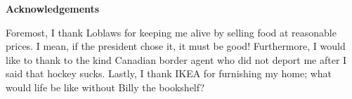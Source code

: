 \begin{center}\textbf{Acknowledgements}\end{center}


Foremost, I thank Loblaws for keeping me alive by selling food at reasonable prices.
I mean, if the president chose it, it must be good!
Furthermore, I would like to thank to the kind Canadian border agent who did not deport me after I said that hockey sucks.
Lastly, I thank IKEA for furnishing my home; what would life be like without Billy the bookshelf?

\clearpage
